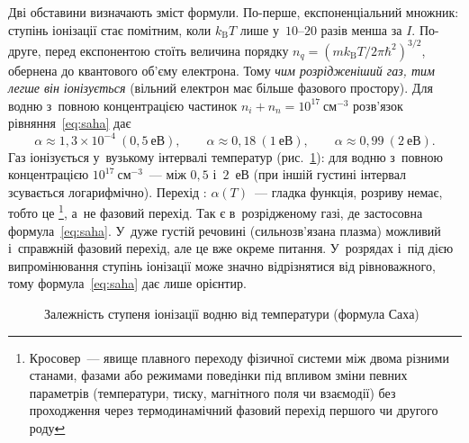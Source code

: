 Дві обставини визначають зміст формули. По-перше, експоненціальний множник: ступінь
іонізації стає помітним, коли $k_{\mathrm B}T$ лише у~$10$--$20$ разів менша за $I$.
По-друге, перед експонентою стоїть величина порядку $n_q=(mk_{\mathrm
B}T/2\pi\hbar^2)^{3/2}$, обернена до квантового об'єму електрона. Тому \emph{чим
розрідженіший газ, тим легше він іонізується} (вільний електрон має більше фазового
простору). Для водню з~повною концентрацією частинок $n_i+n_n=10^{17}~\mathrm{см}^{-3}$
розв'язок рівняння~\eqref{eq:saha} дає
\begin{equation*}
	\alpha\approx1{,}3\times10^{-4}\ (0{,}5~\text{еВ}),\qquad
	\alpha\approx0{,}18\ (1~\text{еВ}),\qquad
	\alpha\approx0{,}99\ (2~\text{еВ}).
\end{equation*}
Газ іонізується у~вузькому інтервалі температур (рис.~\ref{tikz:saha-curve}): для водню
з~повною концентрацією $10^{17}~\mathrm{см}^{-3}$~--- між $0{,}5$ і~$2$~еВ (при іншій
густині інтервал зсувається логарифмічно). Перехід : $\alpha(T)$~--- гладка
функція, розриву немає, тобто це \footnote{Кросовер~--- явище плавного
переходу фізичної системи між двома різними станами, фазами або режимами поведінки під
впливом зміни певних параметрів (температури, тиску, магнітного поля чи взаємодії) без
проходження через термодинамічний фазовий перехід першого чи другого роду}, а~не фазовий
перехід. Так є в~розрідженому газі, де застосовна формула~\eqref{eq:saha}. У~дуже густій
речовині (сильнозв'язана плазма) можливий і~справжній фазовий перехід, але це вже окреме
питання. У~розрядах і~під дією випромінювання ступінь іонізації може значно відрізнятися
від рівноважного, тому формула~\eqref{eq:saha} дає лише орієнтир.


\begin{figure}[h!]\centering
{}
\caption{Залежність ступеня іонізації водню від температури (формула Саха)}
\label{tikz:saha-curve}
\end{figure}




